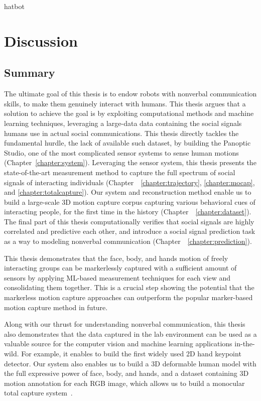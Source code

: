 
hatbot\chapter{Discussion}
\label{chapter:discussion}

\section{Summary}

The ultimate goal of this thesis is to endow robots with nonverbal communication skills, to make them genuinely interact with humans. This thesis argues that a solution to achieve the goal is by exploiting computational methods and machine learning techniques, leveraging a large-data data containing the social signals humans use in actual social communications. This thesis directly tackles the fundamental hurdle, the lack of available such dataset, by building the Panoptic Studio, one of the most complicated sensor systems to sense human motions (Chapter~\ref{chapter:system}). Leveraging the sensor system, this thesis presents the state-of-the-art measurement method to capture the full spectrum of social signals of interacting individuals (Chapter~~\ref{chapter:trajectory}, \ref{chapter:mocap}, and  \ref{chapter:totalcapture}). Our system and reconstruction method enable us to build a large-scale 3D motion capture corpus capturing various behavioral cues of interacting people, for the first time in the history (Chapter~~\ref{chapter:dataset}). The final part of this thesis computationally verifies that social signals are highly correlated and predictive each other, and introduce a social signal prediction task as a way to modeling nonverbal communication (Chapter~~\ref{chapter:prediction}).

This thesis demonstrates that the face, body, and hands motion of freely interacting groups can be markerlessly captured with a sufficient amount of sensors by applying ML-based measurement techniques for each view and consolidating them together. This is a crucial step showing the potential that the markerless motion capture approaches can outperform the popular marker-based motion capture method in future. 

Along with our thrust for understanding nonverbal communication, this thesis also demonstrates that the data captured in the lab environment can be used as a valuable source for the computer vision and machine learning applications in-the-wild. For example, it enables to build the first widely used 2D hand keypoint detector\cite{simon2017hand}. Our system also enables us to build a 3D deformable human model with the full expressive power of face, body, and hands, and a dataset containing 3D motion annotation for each RGB image, which allows us to build a monocular total capture system~\cite{Xiang2019}. 

